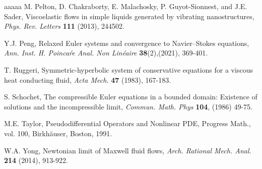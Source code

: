 \documentclass[10pt,reqno]{amsart}
\numberwithin{equation}{section}
\begin{document}
\begin{thebibliography}{aaaaa}
 M. Pelton, D. Chakraborty, E. Malachosky, P. Guyot-Sionnest, and J.E. Sader, Viscoelastic flows in simple liquids generated by vibrating nanostructures, {\it Phys. Rev. Letters} {\bf 111} (2013), 244502.

 Y.J. Peng, Relaxed Euler systems and convergence to Navier–Stokes equations, {\it Ann. Inst. H. Poinca\'re Anal. Non
Lin\'eaire} {\bf 38}(2),(2021), 369-401. 

T. Ruggeri, Symmetric-hyperbolic system of conservative equations for a viscous heat conducting fluid, {\it Acta Mech.} {\bf 47} (1983), 167-183.


 S. Schochet, The compressible Euler equations in a bounded domain: Existence of solutions and the incompressible limit, {\it Commun. Math. Phys} {\bf 104}, (1986) 49-75.



 M.E. Taylor, Pseudodifferential Operators and Nonlinear PDE, Progress Math., vol. 100, Birkhäuser, Boston, 1991.

 
 W.A. Yong, Newtonian limit of Maxwell fluid flows, {\it Arch. Rational Mech. Anal.} {\bf 214} (2014), 913-922.


\end{thebibliography}
\end{document}
